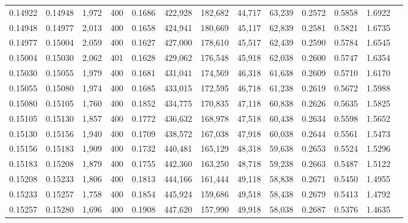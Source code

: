 \begin{tabular}{rrrrrrrrrrrrr}
0.14922 & 0.14948 &  1,972 &   400 &                                     0.1686 & 422,928 & 182,682 &  44,717 &  63,239 & 0.2572 & 0.5858 & 1.6922 \\
0.14948 & 0.14977 &  2,013 &   400 &                                     0.1658 & 424,941 & 180,669 &  45,117 &  62,839 & 0.2581 & 0.5821 & 1.6735 \\
0.14977 & 0.15004 &  2,059 &   400 &                                     0.1627 & 427,000 & 178,610 &  45,517 &  62,439 & 0.2590 & 0.5784 & 1.6545 \\
0.15004 & 0.15030 &  2,062 &   401 &                                     0.1628 & 429,062 & 176,548 &  45,918 &  62,038 & 0.2600 & 0.5747 & 1.6354 \\
0.15030 & 0.15055 &  1,979 &   400 &                                     0.1681 & 431,041 & 174,569 &  46,318 &  61,638 & 0.2609 & 0.5710 & 1.6170 \\
0.15055 & 0.15080 &  1,974 &   400 &                                     0.1685 & 433,015 & 172,595 &  46,718 &  61,238 & 0.2619 & 0.5672 & 1.5988 \\
0.15080 & 0.15105 &  1,760 &   400 &                                     0.1852 & 434,775 & 170,835 &  47,118 &  60,838 & 0.2626 & 0.5635 & 1.5825 \\
0.15105 & 0.15130 &  1,857 &   400 &                                     0.1772 & 436,632 & 168,978 &  47,518 &  60,438 & 0.2634 & 0.5598 & 1.5652 \\
0.15130 & 0.15156 &  1,940 &   400 &                                     0.1709 & 438,572 & 167,038 &  47,918 &  60,038 & 0.2644 & 0.5561 & 1.5473 \\
0.15156 & 0.15183 &  1,909 &   400 &                                     0.1732 & 440,481 & 165,129 &  48,318 &  59,638 & 0.2653 & 0.5524 & 1.5296 \\
0.15183 & 0.15208 &  1,879 &   400 &                                     0.1755 & 442,360 & 163,250 &  48,718 &  59,238 & 0.2663 & 0.5487 & 1.5122 \\
0.15208 & 0.15233 &  1,806 &   400 &                                     0.1813 & 444,166 & 161,444 &  49,118 &  58,838 & 0.2671 & 0.5450 & 1.4955 \\
0.15233 & 0.15257 &  1,758 &   400 &                                     0.1854 & 445,924 & 159,686 &  49,518 &  58,438 & 0.2679 & 0.5413 & 1.4792 \\
0.15257 & 0.15280 &  1,696 &   400 &                                     0.1908 & 447,620 & 157,990 &  49,918 &  58,038 & 0.2687 & 0.5376 & 1.4635 \\

\end{tabular}
